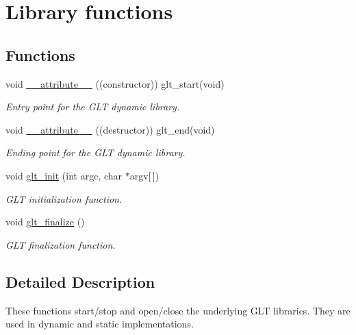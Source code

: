 \hypertarget{group__LIB}{\section{Library functions}
\label{group__LIB}
}
\subsection*{Functions}
\begin{DoxyCompactItemize}
\item 
void \hyperlink{group__LIB_gae387d3314ab7028a9bd1b841df20830e}{\-\_\-\-\_\-attribute\-\_\-\-\_\-} ((constructor)) glt\-\_\-start(void)
\begin{DoxyCompactList}\small\item\em Entry point for the G\-L\-T dynamic library. \end{DoxyCompactList}\item 
void \hyperlink{group__LIB_ga341b34f027da273cf053492b981529c4}{\-\_\-\-\_\-attribute\-\_\-\-\_\-} ((destructor)) glt\-\_\-end(void)
\begin{DoxyCompactList}\small\item\em Ending point for the G\-L\-T dynamic library. \end{DoxyCompactList}\item 
void \hyperlink{group__LIB_gae25b983d8269aa647ae7ba8cd2aa55b6}{glt\-\_\-init} (int argc, char $\ast$argv\mbox{[}$\,$\mbox{]})
\begin{DoxyCompactList}\small\item\em G\-L\-T initialization function. \end{DoxyCompactList}\item 
void \hyperlink{group__LIB_gadd91c2b80a0b22baf6f363f13a23c82e}{glt\-\_\-finalize} ()
\begin{DoxyCompactList}\small\item\em G\-L\-T finalization function. \end{DoxyCompactList}\end{DoxyCompactItemize}


\subsection{Detailed Description}
These functions start/stop and open/close the underlying G\-L\-T libraries. They are used in dynamic and static implementations. 

